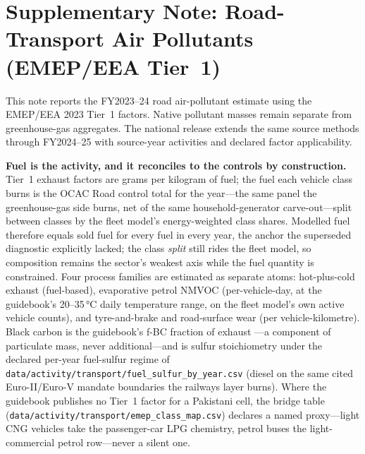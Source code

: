 \section{Supplementary Note: Road-Transport Air Pollutants (EMEP/EEA Tier~1)}
\label{sec:air}

This note reports the FY2023--24 road air-pollutant estimate using the EMEP/EEA 2023 Tier~1 factors. Native pollutant masses remain separate from greenhouse-gas aggregates. The national release extends the same source methods through FY2024--25 with source-year activities and declared factor applicability.

\textbf{Fuel is the activity, and it reconciles to the controls by construction.}
Tier~1 exhaust factors are grams per kilogram of fuel; the fuel each vehicle class
burns is the OCAC Road control total for the year---the same panel the greenhouse-gas
side burns, net of the same household-generator carve-out---split between classes by
the fleet model's energy-weighted class shares. Modelled fuel therefore equals sold
fuel for every fuel in every year, the anchor the superseded diagnostic explicitly
lacked; the class \emph{split} still rides the fleet model, so composition remains the
sector's weakest axis while the fuel quantity is constrained. Four process families are
estimated as separate atoms: hot-plus-cold exhaust (fuel-based), evaporative petrol
NMVOC (per-vehicle-day, at the guidebook's 20--35\,\si{\celsius} daily temperature
range, on the fleet model's own active vehicle counts), and tyre-and-brake and
road-surface wear (per vehicle-kilometre). Black carbon is the guidebook's f-BC
fraction of exhaust \PM{}---a component of particulate mass, never additional---and
\SOtwo{} is sulfur stoichiometry under the declared per-year fuel-sulfur regime of
\texttt{data/activity/transport/fuel\_sulfur\_by\_year.csv} (diesel on the same cited
Euro-II/Euro-V mandate boundaries the railways layer burns). Where the guidebook
publishes no Tier~1 factor for a Pakistani cell, the bridge table
(\texttt{data/activity/transport/emep\_class\_map.csv}) declares a named proxy---light
CNG vehicles take the passenger-car LPG chemistry, petrol buses the light-commercial
petrol row---never a silent one.

